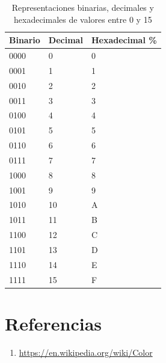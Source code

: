 \documentclass[../principal.tex]{subfiles}
\begin{document}
\begin{table}
\caption{Representaciones binarias, decimales y hexadecimales de valores entre 0 y 15}
\label{tab:starch}
\tbfont
\begin{tabular}{@{}lll}
\toprule
\thfont Binario & \thfont Decimal & \thfont Hexadecimal \% \\
\midrule
0000 & 0  & 0 \\
0001 & 1  & 1 \\
0010 & 2  & 2 \\
0011 & 3  & 3 \\
0100 & 4  & 4 \\
0101 & 5  & 5 \\
0110 & 6  & 6 \\
0111 & 7  & 7 \\
1000 & 8  & 8 \\
1001 & 9  & 9 \\
1010 & 10 & A \\
1011 & 11 & B \\
1100 & 12 & C \\
1101 & 13 & D \\
1110 & 14 & E \\
1111 & 15 & F \\
\bottomrule
\end{tabular}
\end{table}

\section{Referencias}

\begin{enumerate}
    \item \url{https://en.wikipedia.org/wiki/Color}
\end{enumerate}
\end{document}
